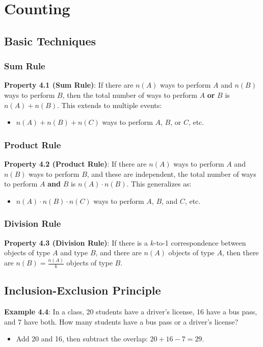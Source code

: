 \section{Counting}

\subsection{Basic Techniques}

\subsubsection*{Sum Rule}
\textbf{Property 4.1 (Sum Rule)}: If there are $n(A)$ ways to perform $A$ and $n(B)$ ways to perform $B$, then the total number of ways to perform $A$ \textbf{or} $B$ is $n(A) + n(B)$. This extends to multiple events:
\begin{itemize}
    \item $n(A) + n(B) + n(C)$ ways to perform $A$, $B$, or $C$, etc.
\end{itemize}

\subsubsection*{Product Rule}
\textbf{Property 4.2 (Product Rule)}: If there are $n(A)$ ways to perform $A$ and $n(B)$ ways to perform $B$, and these are independent, the total number of ways to perform $A$ \textbf{and} $B$ is $n(A) \cdot n(B)$. This generalizes as:
\begin{itemize}
    \item $n(A) \cdot n(B) \cdot n(C)$ ways to perform $A$, $B$, and $C$, etc.
\end{itemize}

\subsubsection*{Division Rule}
\textbf{Property 4.3 (Division Rule)}: If there is a $k$-to-1 correspondence between objects of type $A$ and type $B$, and there are $n(A)$ objects of type $A$, then there are $n(B) = \frac{n(A)}{k}$ objects of type $B$.

\subsection{Inclusion-Exclusion Principle}

\textbf{Example 4.4}: In a class, 20 students have a driver’s license, 16 have a bus pass, and 7 have both. How many students have a bus pass or a driver’s license?
\begin{itemize}
    \item Add 20 and 16, then subtract the overlap: $20 + 16 - 7 = 29$.
\end{itemize}

